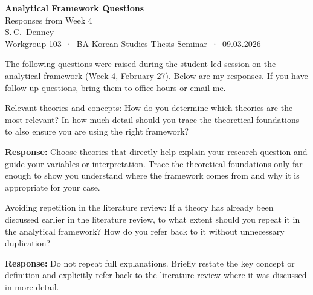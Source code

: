 \documentclass[11pt,a4paper]{article}
\begin{document}
\begin{center}
  {\LARGE\bfseries\color{leidenblu} Analytical Framework Questions}\\[4pt]
  {\large\color{leidenblu} Responses from Week 4}\\[8pt]
  {\normalsize S.\,C.\ Denney}\\[3pt]
  {\small Workgroup 103 \,·\, BA Korean Studies Thesis Seminar \,·\, 09.03.2026}
\end{center}

\vspace{0.8em}

\noindent
The following questions were raised during the student-led session on the analytical framework (Week 4, February 27). Below are my responses. If you have follow-up questions, bring them to office hours or email me.

\vspace{1em}


\begin{questionbox}
Relevant theories and concepts: How do you determine which theories are the most relevant? In how much detail should you trace the theoretical foundations to also ensure you are using the right framework?
\end{questionbox}

\noindent\textbf{Response:} Choose theories that directly help explain your research question and guide your variables or interpretation. Trace the theoretical foundations only far enough to show you understand where the framework comes from and why it is appropriate for your case.

\vspace{1.2em}


\begin{questionbox}
Avoiding repetition in the literature review: If a theory has already been discussed earlier in the literature review, to what extent should you repeat it in the analytical framework? How do you refer back to it without unnecessary duplication?
\end{questionbox}

\noindent\textbf{Response:} Do not repeat full explanations. Briefly restate the key concept or definition and explicitly refer back to the literature review where it was discussed in more detail.
\end{document}
